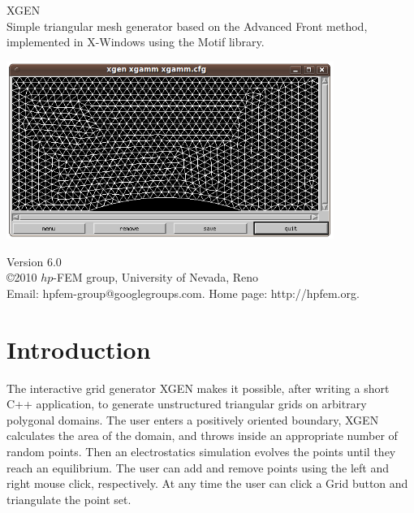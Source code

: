 \documentclass[12pt]{article}
\begin{document}
  \begin{titlepage}
  \begin{center}
\vbox{}

    \vspace{30mm}

    {\Huge  XGEN}\\[6mm]

Simple triangular mesh generator based on the Advanced Front method,\\
implemented in X-Windows using the Motif library.

    \vspace{20mm}

\begin{center}
\includegraphics[width=0.8\textwidth]{xgamm.png}
\end{center}
    \vspace{20mm}

    Version 6.0\\
    \copyright 2010 $hp$-FEM group, University of Nevada, Reno\\
    Email: hpfem-group@googlegroups.com. Home page: http://hpfem.org.

  \end{center}
  \end{titlepage}

  \section{Introduction}

  The interactive grid generator XGEN makes it possible,
  after writing a short C++ application, to generate unstructured
  triangular grids on arbitrary polygonal domains. 
  The user enters a positively oriented boundary,
  XGEN calculates the area of the domain, and throws inside an
  appropriate number of random points. Then an electrostatics simulation 
  evolves the points until they reach an equilibrium. 
  The user can add and remove points using the left and right mouse click,
  respectively. At any time the user can click a Grid button and 
  triangulate the point set.
\end{document}
